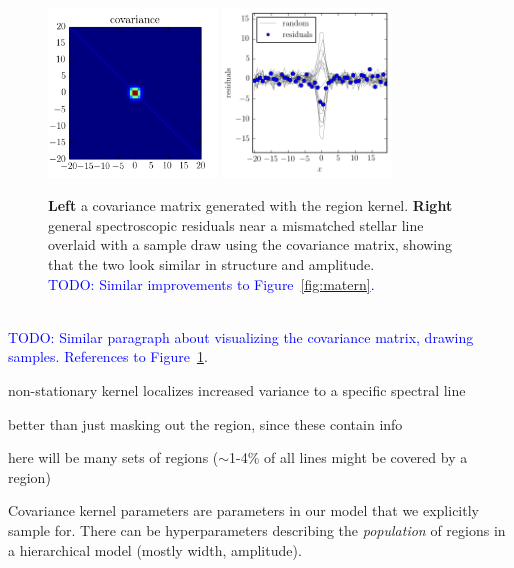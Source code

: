 \documentclass[preprint]{aastex} %
\newcommand{\todo}[1]{ \textcolor{Blue}{\\TODO: #1}}
\begin{document}
\begin{figure}[!htb]
\begin{center}
\includegraphics[width=0.4\textwidth]{figs/matrix_region_covariance.png}
\includegraphics[width=0.4\textwidth]{figs/random_draw.png}
\caption{\textbf{Left} a covariance matrix generated with the region kernel.
\textbf{Right} general spectroscopic residuals near a mismatched stellar line
 overlaid with a sample draw using the covariance matrix, showing that the two
 look similar in structure and amplitude. 
\protect \todo{Similar improvements to
  Figure~\ref{fig:matern}.}}
\label{fig:region}
\end{center}
\end{figure}

\todo{Similar paragraph about visualizing the covariance matrix, drawing
  samples. References to Figure~\ref{fig:region}.}

non-stationary kernel localizes increased variance to a specific
    spectral line

better than just masking out the region, since these contain info

here will be many sets of regions ($\sim$1-4\% of all lines might be
    covered by a region)
  
Covariance kernel parameters are parameters in our model that we explicitly sample for. There can be hyperparameters describing the \emph{population} of regions in a hierarchical model (mostly width, amplitude).
\end{document}
